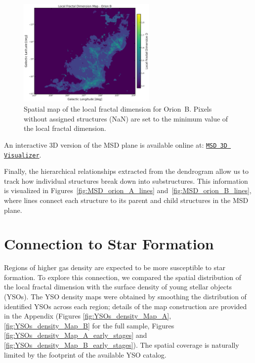 \begin{figure}[t]
    \centering
    \includegraphics[width=0.6\textwidth]{figures/local_fractal_dimension_map_Orion_B.png}
    \caption{Spatial map of the local fractal dimension for Orion~B. Pixels without assigned structures (NaN) are set to the minimum value of the local fractal dimension.}
    \label{fig:local_B_map}
\end{figure}

An interactive 3D version of the MSD plane is available online at:  
\href{https://simonesped.github.io/MSD_Viz/}{\texttt{MSD 3D Visualizer}}.

Finally, the hierarchical relationships extracted from the dendrogram allow us to track how individual structures break down into substructures.  
This information is visualized in Figures~\ref{fig:MSD_orion_A_lines} and~\ref{fig:MSD_orion_B_lines}, where lines connect each structure to its parent and child structures in the MSD plane.

\section{Connection to Star Formation}

Regions of higher gas density are expected to be more susceptible to star formation.  
To explore this connection, we compared the spatial distribution of the local fractal dimension with the surface density of young stellar objects (YSOs).  
The YSO density maps were obtained by smoothing the distribution of identified YSOs across each region; details of the map construction are provided in the Appendix (Figures \ref{fig:YSOs_density_Map_A}, \ref{fig:YSOs_density_Map_B} for the full sample, Figures \ref{fig:YSOs_density_Map_A_early_stages} and \ref{fig:YSOs_density_Map_B_early_stages}).  
The spatial coverage is naturally limited by the footprint of the available YSO catalog.

